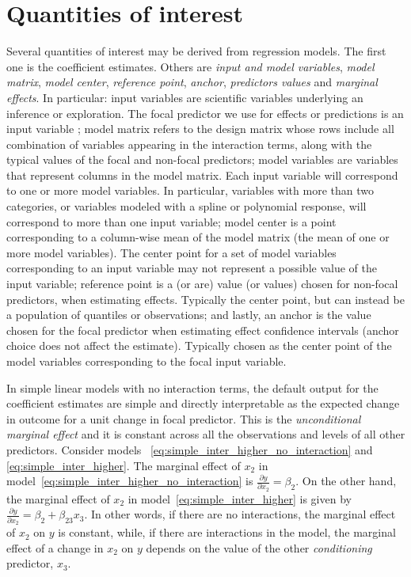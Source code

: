 \documentclass[10pt,letterpaper]{article}
\begin{document}
\section*{Quantities of interest}

Several quantities of interest may be derived from regression models. The first one is the coefficient estimates. Others are \emph{input and model variables}, \emph{model matrix}, \emph{model center}, \emph{reference point}, \emph{anchor}, \emph{predictors values} and \emph{marginal effects}. In particular: input variables are scientific variables underlying an inference or exploration. The focal predictor we use for effects or predictions is an input variable \cite{schielzeth2010simple}; model matrix refers to the design matrix whose rows include all combination of variables appearing in the interaction terms, along with the typical values of the focal and non-focal predictors; model variables are variables that represent columns in the model matrix. Each input variable will correspond to one or more model variables. In particular, variables with more than two categories, or variables modeled with a spline or polynomial response, will correspond to more than one input variable; model center is a point corresponding to a column-wise mean of the model matrix (the mean of one or more model variables). The center point for a set of model variables corresponding to an input variable may not represent a possible value of the input variable; reference point is a (or are) value (or values) chosen for non-focal predictors, when estimating effects. Typically the center point, but can instead be a population of quantiles or observations; and lastly, an anchor is the value chosen for the focal predictor when estimating effect confidence intervals (anchor choice does not affect the estimate). Typically chosen as the center point of the model variables corresponding to the focal input variable.

In simple linear models with no interaction terms, the default output for the coefficient estimates are simple and directly interpretable as the expected change in outcome for a unit change in focal predictor. This is the \emph{unconditional marginal effect} \cite{leeper2017interpreting} and it is constant across all the observations and levels of all other predictors. Consider models ~\ref{eq:simple_inter_higher_no_interaction} and \ref{eq:simple_inter_higher}. The marginal effect of $x_2$ in model~\ref{eq:simple_inter_higher_no_interaction} is $\frac{\partial y}{\partial x_2} = \beta_2$. On the other hand, the marginal effect of $x_2$ in model~\ref{eq:simple_inter_higher} is given by $\frac{\partial y}{\partial x_2} = \beta_2 + \beta_{23}x_3$. In other words, if there are no interactions, the marginal effect of $x_2$ on $y$ is constant, while, if there are interactions in the model, the marginal effect of a change in $x_2$ on $y$ depends on the value of the other \emph{conditioning} predictor, $x_3$. 
\end{document}
